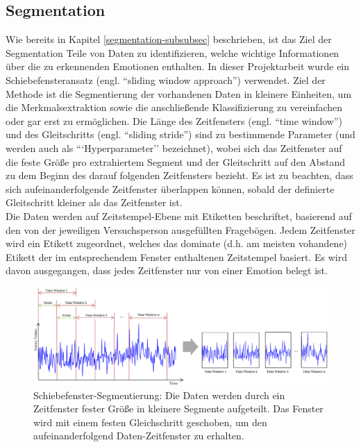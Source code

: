 \subsection{Segmentation} \label{segmenation-1}

Wie bereits in Kapitel \ref{segmentation-subsubsec} beschrieben, ist das Ziel der Segmentation Teile von Daten zu identifizieren, welche wichtige Informationen über die zu erkennenden Emotionen enthalten.
In dieser Projektarbeit wurde ein Schiebefensteransatz (engl. ``sliding window approach'') verwendet. 
Ziel der Methode ist die Segmentierung der vorhandenen Daten in kleinere Einheiten, um die Merkmalsextraktion sowie die anschließende Klassifizierung zu vereinfachen oder gar erst zu ermöglichen.
Die Länge des Zeitfensters (engl. ``time window'') und des Gleitschritts (engl. ``sliding stride'') sind zu bestimmende Parameter (und werden auch als ```Hyperparameter'' bezeichnet), wobei sich das Zeitfenster auf die feste Größe pro extrahiertem Segment und der Gleitschritt auf den Abstand zu dem Beginn des darauf folgenden Zeitfensters bezieht.
Es ist zu beachten, dass sich aufeinanderfolgende Zeitfenster überlappen können, sobald der definierte Gleitschritt kleiner als das Zeitfenster ist. \\


Die Daten werden auf Zeitstempel-Ebene mit Etiketten beschriftet, basierend auf den von der jeweiligen Versuchsperson ausgefüllten Fragebögen. 
Jedem Zeitfenster wird ein Etikett zugeordnet, welches das dominate (d.h. am meisten vohandene) Etikett der im entsprechendem Fenster enthaltenen Zeitstempel basiert. Es wird davon ausgegangen, dass jedes Zeitfenster nur von einer Emotion belegt ist. \\


\begin{figure}[h]
\includegraphics[width=\textwidth]{Images/segmentation.png} 
\caption[Schiebefenster-Segmentierung]{Schiebefenster-Segmentierung: Die Daten werden durch ein Zeitfenster fester Größe in kleinere Segmente aufgeteilt. Das Fenster wird mit einem festen Gleichschritt geschoben, um den aufeinanderfolgend Daten-Zeitfenster zu erhalten. }
\end{figure} 